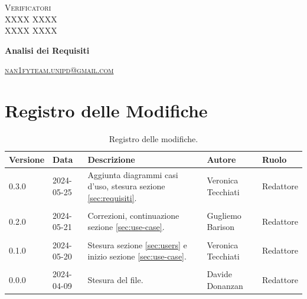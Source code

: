 \documentclass[8pt]{article}
\begin{document}
\begin{titlepage}
\begin{minipage}[t]{0.47\textwidth}
{		}
		\vspace{8mm}
		
		{\large{\textsc{Verificatori}}
			\vspace{3mm}
			{\\\large{\textsc{XXXX XXXX}\\}} 
			{\large{\textsc{XXXX XXXX}}}
			
		}
		\vspace{4mm}\vspace{4mm}
	\end{minipage}
	\vspace{4cm}
	\begin{center}
		\begin{flushright}
			{\fontsize{30pt}{52pt}\selectfont \textbf{Analisi dei Requisiti\\}} %
		\end{flushright}
		\vspace{3cm}
	\end{center}
	\vspace{9.5cm}
	{\small \textsc{\href{mailto: nan1fyteam.unipd@gmail.com}{\color{black}nan1fyteam.unipd@gmail.com}}}
\end{titlepage}
\pagestyle{mystyle}
\section*{Registro delle Modifiche}
\begin{table}[ht!]
\hypersetup{hidelinks}
	\centering
	\begin{tabular}{p{1.2cm} p{2cm} p{6cm} p{3cm} p{2cm}}
		\toprule
		\textbf{Versione}& \textbf{Data} & \textbf{Descrizione} & \textbf{Autore} & \textbf{Ruolo} \\
		\midrule
            0.3.0 & 2024-05-25 & Aggiunta diagrammi casi d'uso, stesura sezione \ref{sec:requisiti}. & Veronica Tecchiati & Redattore \\\\
            0.2.0 & 2024-05-21 & Correzioni, continuazione sezione \ref{sec:use-case}. & Gugliemo Barison & Redattore \\\\
            0.1.0 & 2024-05-20 & Stesura sezione \ref{sec:users} e inizio sezione \ref{sec:use-case}. & Veronica Tecchiati & Redattore \\\\
		0.0.0 & 2024-04-09 & Stesura del file. & Davide Donanzan & Redattore \\
		\bottomrule
	\end{tabular}
	\caption{Registro delle modifiche.}
	\label{table:Registro delle modifiche}
\end{table}
\newpage
{\hypersetup{hidelinks} \tableofcontents}
\clearpage
\newpage
{\hypersetup{hidelinks} \listoffigures}
\newpage
{\hypersetup{hidelinks} \listoftables}
\newpage
\justifying
\end{document}
